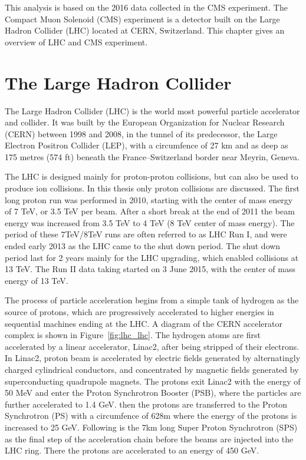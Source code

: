 
This analysis is based on the 2016 data collected in the CMS experiment. The Compact Muon Solenoid (CMS) experiment is a detector built on the Large Hadron Collider (LHC) located at CERN, Switzerland. This chapter gives an overview of LHC and CMS experiment.

\section{The Large Hadron Collider} 
The Large Hadron Collider (LHC) is the world most powerful particle accelerator and collider\cite{lhc_lhcmachine,lhc_lhcreport}. It was built by the European Organization for Nuclear Research (CERN) between 1998 and 2008, in the tunnel of its predecessor, the Large Electron Positron Collider (LEP), with a circumfence of 27 km and as deep as 175 metres (574 ft) beneath the France–Switzerland border near Meyrin, Geneva. 

\vspace{0.3cm}
The LHC is designed mainly for proton-proton collisions, but can also be used to produce ion collisions. In this thesis only proton collisions are discussed. The first long proton run was performed in 2010, starting with the center of mass energy of 7 TeV, or 3.5 TeV per beam. After a short break at the end of 2011 the beam energy was increased from 3.5 TeV to 4 TeV (8 TeV center of mass energy). The period of these 7TeV/8TeV runs are often referred to as LHC Run I, and were ended early 2013 as the LHC came to the shut down period. The shut down period last for 2 years mainly for the LHC upgrading, which enabled collisions at 13 TeV. The Run II data taking started on 3 June 2015, with the center of mass energy of 13 TeV. 

\vspace{0.3cm}
The process of particle acceleration begins from a simple tank of hydrogen as the source of protons, which are progressively accelerated to higher energies in sequential machines ending at the LHC. A diagram of the CERN accelerator complex is shown in Figure~\ref{fig:lhc_lhc}. The hydrogen atoms are first accelerated by a linear accelerator, Linac2, after being stripped of their electrons. In Linac2, proton beam is accelerated by electric fields generated by alternatingly charged cylindrical conductors, and concentrated by magnetic fields generated by superconducting quadrupole magnets. The protons exit Linac2 with the energy of 50 MeV and enter the Proton Synchrotron Booster (PSB), where the particles are further accelerated to 1.4 GeV.  then the protons are transferred to the Proton Synchrotron (PS) with a circumfence of 628m where the energy of the protons is increased to 25 GeV. Following is the 7km long Super Proton Synchrotron (SPS) as the final step of the acceleration chain before the beams are injected into the LHC ring. There the protons are accelerated to an energy of 450 GeV.

